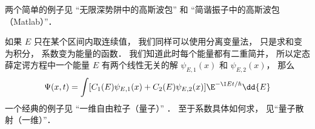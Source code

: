 两个简单的例子见 “无限深势阱中的高斯波包” 和 “简谐振子中的高斯波包（Matlab）”．

如果 $E$ 只在某个区间内取连续值， 我们同样可以使用分离变量法， 只是求和变为积分， 系数变为能量的函数． 我们知道此时每个能量都有二重简并， 所以定态薛定谔方程中一个能量 $E$ 有两个线性无关的解 $\psi_{E,1}(x)$ 和 $\psi_{E,2}(x)$， 那么
\begin{equation}\label{TDSE11_eq4}
\Psi(x, t) = \int [C_1(E) \psi_{E,1}(x) + C_2(E) \psi_{E,2}(x)] \E^{-\I E t/\hbar} \dd{E}
\end{equation}
一个经典的例子见 “一维自由粒子（量子）” ． 至于系数具体如何求， 见“量子散射（一维）”．
